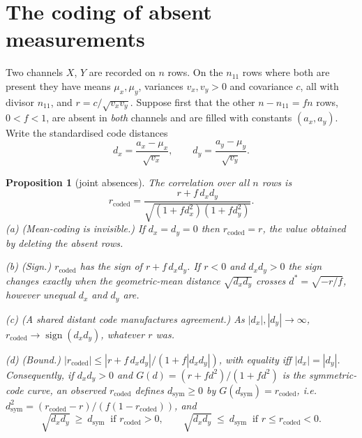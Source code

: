 \documentclass[11pt]{article}
\newtheorem{proposition}[theorem]{Proposition}
\theoremstyle{definition}\newtheorem{definition}[theorem]{Definition}
\theoremstyle{remark}\newtheorem{remark}[theorem]{Remark}
\begin{document}
\section{The coding of absent measurements}\label{sec:code}
Two channels $X$, $Y$ are recorded on $n$ rows. On the $n_{11}$ rows where both are present they have means $\mu_x,\mu_y$, variances $v_x,v_y>0$ and covariance $c$, all with divisor $n_{11}$, and $r=c/\sqrt{v_xv_y}$. Suppose first that the other $n-n_{11}=fn$ rows, $0<f<1$, are absent in \emph{both} channels and are filled with constants $(a_x,a_y)$. Write the standardised code distances
\[
d_x=\frac{a_x-\mu_x}{\sqrt{v_x}},\qquad d_y=\frac{a_y-\mu_y}{\sqrt{v_y}} .
\]

\begin{proposition}[joint absences]\label{prop:code}
The correlation over all $n$ rows is
\begin{equation}\label{eq:code}
r_{\mathrm{coded}}=\frac{r+f\,d_xd_y}{\sqrt{(1+fd_x^2)(1+fd_y^2)}} .
\end{equation}
(a) (Mean-coding is invisible.) If $d_x=d_y=0$ then $r_{\mathrm{coded}}=r$, the value obtained by deleting the absent rows.
\par\noindent(b) (Sign.) $r_{\mathrm{coded}}$ has the sign of $r+f\,d_xd_y$. If $r<0$ and $d_xd_y>0$ the sign changes exactly when the geometric-mean distance $\sqrt{d_xd_y}$ crosses $d^*=\sqrt{-r/f}$, however unequal $d_x$ and $d_y$ are.
\par\noindent(c) (A shared distant code manufactures agreement.) As $|d_x|,|d_y|\to\infty$, $r_{\mathrm{coded}}\to\operatorname{sign}(d_xd_y)$, whatever $r$ was.
\par\noindent(d) (Bound.) $|r_{\mathrm{coded}}|\le|r+f\,d_xd_y|/(1+f|d_xd_y|)$, with equality iff $|d_x|=|d_y|$. Consequently, if $d_xd_y>0$ and $G(d)=(r+fd^2)/(1+fd^2)$ is the symmetric-code curve, an observed $r_{\mathrm{coded}}$ defines $d_{\mathrm{sym}}\ge0$ by $G(d_{\mathrm{sym}})=r_{\mathrm{coded}}$, i.e.\ $d_{\mathrm{sym}}^2=(r_{\mathrm{coded}}-r)/(f(1-r_{\mathrm{coded}}))$, and
\[
\sqrt{d_xd_y}\ \ge\ d_{\mathrm{sym}}\ \text{ if } r_{\mathrm{coded}}>0,\qquad \sqrt{d_xd_y}\ \le\ d_{\mathrm{sym}}\ \text{ if } r\le r_{\mathrm{coded}}<0 .
\]
\end{proposition}
\end{document}
